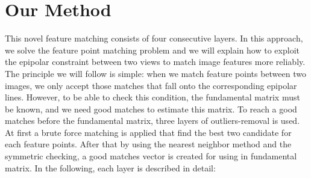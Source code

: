 \section {Our Method}
This novel feature matching consists of four consecutive layers. In this approach, we solve the feature point matching problem and we will explain how to exploit the epipolar constraint between two views to match image features more reliably.\\
The principle we will follow is simple: when we match feature points between two images, we only accept those matches that fall onto the corresponding epipolar lines. However, to be able to check this condition, the fundamental matrix must be known, and we need good matches to estimate this matrix. To reach a good matches before the fundamental matrix, three layers of outliers-removal is used. At first a brute force matching is applied that find the best two candidate for each feature points. After that by using the nearest neighbor method and the symmetric checking, a good matches vector is created for using in fundamental matrix.
In the following, each layer is described in detail:
